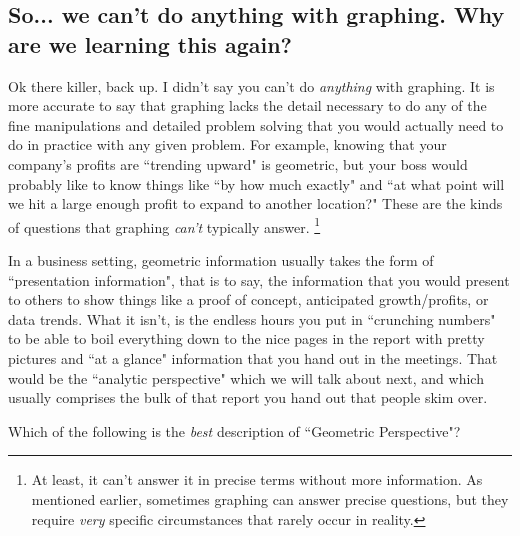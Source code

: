 \documentclass{ximeraXloud}
\begin{document}
\subsection*{So... we can't do anything with graphing. Why are we learning this again?}
    
    Ok there killer, back up. I didn't say you can't do \textit{anything} with graphing. It is more accurate to say that graphing lacks the detail necessary to do any of the fine manipulations and detailed problem solving that you would actually need to do in practice with any given problem. For example, knowing that your company's profits are ``trending upward" is geometric, but your boss would probably like to know things like ``by how much exactly" and ``at what point will we hit a large enough profit to expand to another location?" These are the kinds of questions that graphing \textit{can't} typically answer.%
    \footnote{%
        At least, it can't answer it in precise terms without more information. As mentioned earlier, sometimes graphing can answer precise questions, but they require \textit{very} specific circumstances that rarely occur in reality.%
        }
    
    In a business setting, geometric information usually takes the form of ``presentation information", that is to say, the information that you would present to others to show things like a proof of concept, anticipated growth/profits, or data trends. What it isn't, is the endless hours you put in ``crunching numbers" to be able to boil everything down to the nice pages in the report with pretty pictures and ``at a glance" information that you hand out in the meetings. That would be the ``analytic perspective" which we will talk about next, and which usually comprises the bulk of that report you hand out that people skim over.

\begin{problem}
    Which of the following is the \textit{best} description of ``Geometric Perspective"?
    \begin{multipleChoice}
    \end{multipleChoice}
\end{problem}
\end{document}
